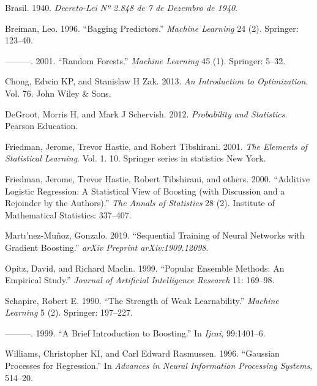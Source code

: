 \documentclass[
	12pt,				%
	a4paper,		%
	oneside,    %
	chapter=TITLE,		   %
	section=TITLE,		   %
	subsection=TITLE,	   %
	subsubsection=TITLE, %
	english,			%
	french,				%
	spanish,			%
	brazil,				%
]{abntex2}
\begin{document}
\leavevmode\hypertarget{ref-brasil1940}{}%
Brasil. 1940. \emph{Decreto-Lei Nº 2.848 de 7 de Dezembro de 1940}.

\leavevmode\hypertarget{ref-breiman1996bagging}{}%
Breiman, Leo. 1996. ``Bagging Predictors.'' \emph{Machine Learning} 24
(2). Springer: 123--40.

\leavevmode\hypertarget{ref-breiman2001random}{}%
---------. 2001. ``Random Forests.'' \emph{Machine Learning} 45 (1).
Springer: 5--32.

\leavevmode\hypertarget{ref-chong2013introduction}{}%
Chong, Edwin KP, and Stanislaw H Zak. 2013. \emph{An Introduction to
Optimization}. Vol. 76. John Wiley \& Sons.

\leavevmode\hypertarget{ref-degroot2012probability}{}%
DeGroot, Morris H, and Mark J Schervish. 2012. \emph{Probability and
Statistics}. Pearson Education.

\leavevmode\hypertarget{ref-friedman2001elements}{}%
Friedman, Jerome, Trevor Hastie, and Robert Tibshirani. 2001. \emph{The
Elements of Statistical Learning}. Vol. 1. 10. Springer series in
statistics New York.

\leavevmode\hypertarget{ref-friedman2000additive}{}%
Friedman, Jerome, Trevor Hastie, Robert Tibshirani, and others. 2000.
``Additive Logistic Regression: A Statistical View of Boosting (with
Discussion and a Rejoinder by the Authors).'' \emph{The Annals of
Statistics} 28 (2). Institute of Mathematical Statistics: 337--407.

\leavevmode\hypertarget{ref-martinez2019sequential}{}%
Martı'nez-Muñoz, Gonzalo. 2019. ``Sequential Training of Neural Networks
with Gradient Boosting.'' \emph{arXiv Preprint arXiv:1909.12098}.

\leavevmode\hypertarget{ref-opitz1999popular}{}%
Opitz, David, and Richard Maclin. 1999. ``Popular Ensemble Methods: An
Empirical Study.'' \emph{Journal of Artificial Intelligence Research}
11: 169--98.

\leavevmode\hypertarget{ref-schapire1990strength}{}%
Schapire, Robert E. 1990. ``The Strength of Weak Learnability.''
\emph{Machine Learning} 5 (2). Springer: 197--227.

\leavevmode\hypertarget{ref-schapire1999brief}{}%
---------. 1999. ``A Brief Introduction to Boosting.'' In \emph{Ijcai},
99:1401--6.

\leavevmode\hypertarget{ref-williams1996gaussian}{}%
Williams, Christopher KI, and Carl Edward Rasmussen. 1996. ``Gaussian
Processes for Regression.'' In \emph{Advances in Neural Information
Processing Systems}, 514--20.

\postextual



\printindex
\end{document}
